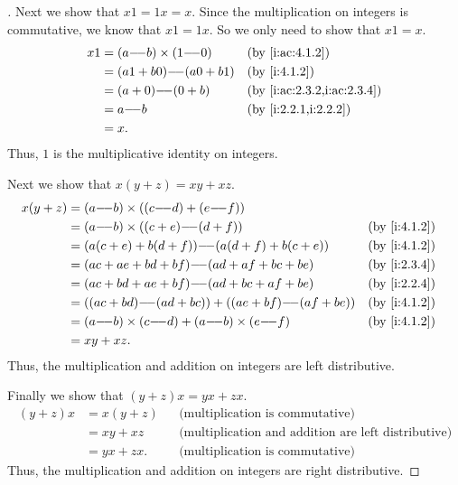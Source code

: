 \begin{proof}[]
  Next we show that \(x1 = 1x = x\).
  Since the multiplication on integers is commutative, we know that \(x1 = 1x\).
  So we only need to show that \(x1 = x\).
  \begin{align*}
    x1 & = (a \mm b) \times (1 \mm 0) &  & \by{i:ac:4.1.2}            \\
       & = (a1 + b0) \mm (a0 + b1)    &  & \by{i:4.1.2}               \\
       & = (a + 0) \mm (0 + b)        &  & \by{i:ac:2.3.2,i:ac:2.3.4} \\
       & = a \mm b                    &  & \by{i:2.2.1,i:2.2.2}       \\
       & = x.
  \end{align*}
  Thus, \(1\) is the multiplicative identity on integers.

  Next we show that \(x(y + z) = xy + xz\).
  \begin{align*}
    x(y + z) & = (a \mm b) \times ((c \mm d) + (e \mm f))                                  \\
             & = (a \mm b) \times ((c + e) \mm (d + f))                  &  & \by{i:4.1.2} \\
             & = (a(c + e) + b(d + f)) \mm (a(d + f) + b(c + e))         &  & \by{i:4.1.2} \\
             & = (ac + ae + bd + bf) \mm (ad + af + bc + be)             &  & \by{i:2.3.4} \\
             & = (ac + bd + ae + bf) \mm (ad + bc + af + be)             &  & \by{i:2.2.4} \\
             & = ((ac + bd) \mm (ad + bc)) + ((ae + bf) \mm (af + be))   &  & \by{i:4.1.2} \\
             & = (a \mm b) \times (c \mm d) + (a \mm b) \times (e \mm f) &  & \by{i:4.1.2} \\
             & = xy + xz.
  \end{align*}
  Thus, the multiplication and addition on integers are left distributive.

  Finally we show that \((y + z)x = yx + zx\).
  \begin{align*}
    (y + z)x & = x(y + z) &  & \text{(multiplication is commutative)}                     \\
             & = xy + xz  &  & \text{(multiplication and addition are left distributive)} \\
             & = yx + zx. &  & \text{(multiplication is commutative)}
  \end{align*}
  Thus, the multiplication and addition on integers are right distributive.
\end{proof}

